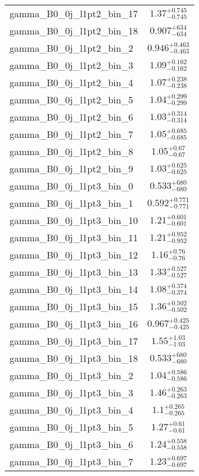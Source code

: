 \begin{tabular}{|l|c|}
gamma\_B0\_0j\_l1pt2\_bin\_17 & $1.37^{+0.745}_{-0.745}$ \\
gamma\_B0\_0j\_l1pt2\_bin\_18 & $0.907^{+634}_{-634}$ \\
gamma\_B0\_0j\_l1pt2\_bin\_2 & $0.946^{+0.463}_{-0.463}$ \\
gamma\_B0\_0j\_l1pt2\_bin\_3 & $1.09^{+0.162}_{-0.162}$ \\
gamma\_B0\_0j\_l1pt2\_bin\_4 & $1.07^{+0.238}_{-0.238}$ \\
gamma\_B0\_0j\_l1pt2\_bin\_5 & $1.04^{+0.299}_{-0.299}$ \\
gamma\_B0\_0j\_l1pt2\_bin\_6 & $1.03^{+0.314}_{-0.314}$ \\
gamma\_B0\_0j\_l1pt2\_bin\_7 & $1.05^{+0.685}_{-0.685}$ \\
gamma\_B0\_0j\_l1pt2\_bin\_8 & $1.05^{+0.67}_{-0.67}$ \\
gamma\_B0\_0j\_l1pt2\_bin\_9 & $1.03^{+0.625}_{-0.625}$ \\
gamma\_B0\_0j\_l1pt3\_bin\_0 & $0.533^{+680}_{-680}$ \\
gamma\_B0\_0j\_l1pt3\_bin\_1 & $0.592^{+0.771}_{-0.771}$ \\
gamma\_B0\_0j\_l1pt3\_bin\_10 & $1.21^{+0.601}_{-0.601}$ \\
gamma\_B0\_0j\_l1pt3\_bin\_11 & $1.21^{+0.952}_{-0.952}$ \\
gamma\_B0\_0j\_l1pt3\_bin\_12 & $1.16^{+0.76}_{-0.76}$ \\
gamma\_B0\_0j\_l1pt3\_bin\_13 & $1.33^{+0.527}_{-0.527}$ \\
gamma\_B0\_0j\_l1pt3\_bin\_14 & $1.08^{+0.374}_{-0.374}$ \\
gamma\_B0\_0j\_l1pt3\_bin\_15 & $1.36^{+0.502}_{-0.502}$ \\
gamma\_B0\_0j\_l1pt3\_bin\_16 & $0.967^{+0.425}_{-0.425}$ \\
gamma\_B0\_0j\_l1pt3\_bin\_17 & $1.55^{+1.03}_{-1.03}$ \\
gamma\_B0\_0j\_l1pt3\_bin\_18 & $0.533^{+680}_{-680}$ \\
gamma\_B0\_0j\_l1pt3\_bin\_2 & $1.04^{+0.586}_{-0.586}$ \\
gamma\_B0\_0j\_l1pt3\_bin\_3 & $1.46^{+0.263}_{-0.263}$ \\
gamma\_B0\_0j\_l1pt3\_bin\_4 & $1.1^{+0.265}_{-0.265}$ \\
gamma\_B0\_0j\_l1pt3\_bin\_5 & $1.27^{+0.61}_{-0.61}$ \\
gamma\_B0\_0j\_l1pt3\_bin\_6 & $1.24^{+0.558}_{-0.558}$ \\
gamma\_B0\_0j\_l1pt3\_bin\_7 & $1.23^{+0.697}_{-0.697}$ \\

\end{tabular}
